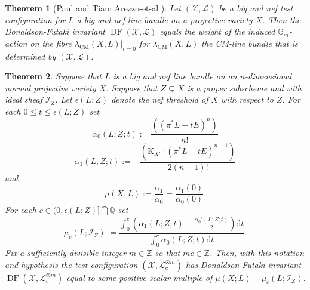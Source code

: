 \documentclass[10pt,a4paper]{amsart}
\newtheorem{theorem}{Theorem}
\newcommand{\Ish}{\mathcal{I}}
\newcommand{\K}{\mathrm{K}}
\newcommand{\QQ}{\mathbb{Q}} %
\newcommand{\ZZ}{\mathbb{Z}} %
\renewcommand{\leq}{\leqslant}
\begin{document}
\begin{theorem}[Paul and Tian; Arezzo-et-al {\cite[Proposition 3.3]{Arezzo:DellaVedova:LaNave}}]\label{Paul:Tian:DF:Thm}
Let $(\mathcal{X},\mathcal{L})$ be a big and nef test configuration for $L$ a big and nef line bundle on a projective variety $X$.  Then the Donaldson-Futaki invariant $\operatorname{DF}(\mathcal{X},\mathcal{L})$ equals the weight of the induced $\mathbb{G}_m$-action on the fibre $\lambda_{\mathrm{CM}}(X,L)|_{t = 0}$ for $\lambda_{\mathrm{CM}}(X,L)$ the CM-line bundle that is determined by $(\mathcal{X},\mathcal{L})$.
\end{theorem}

\begin{theorem}\label{Ross:Thomas:Slope:Stab:DF}
Suppose that $L$ is a big and nef line bundle on an $n$-dimensional normal projective variety $X$.  Suppose that $Z \subsetneq X$ is a proper subscheme and with ideal sheaf $\Ish_Z$.  Let $\epsilon(L;Z)$ denote the nef threshold of $X$ with respect to $Z$.  For each $0 \leq t \leq \epsilon(L;Z)$ set
\begin{equation}\label{alpha0}
\alpha_0(L;Z; t) := \frac{((\pi^*L - t E)^n )}{n!}
\end{equation}
\begin{equation}\label{alpha1}
\alpha_1(L;Z; t) := - \frac{(\K_{X'} \cdot(\pi^*L - t E)^{n-1})}{2(n-1)!}
\end{equation}
and
\begin{equation}\label{slope}
\mu(X;L) := \frac{\alpha_1}{\alpha_0} = \frac{\alpha_1(0)}{\alpha_0(0)} \text{.}
\end{equation}
For each 
$c \in (0, \epsilon(L;Z)] \bigcap \QQ$
set
$$
\mu_c(L;\Ish_Z) := \frac{ \int_0^c \left( \alpha_1(L;Z;t) + \frac{\alpha_0'(L;Z;t)}{2} \right) \mathrm{d}t }{ \int_0^c \alpha_0(L;Z;t) \mathrm{d}t } \text{.}
$$
Fix a sufficiently divisible integer $m \in \ZZ$ so that $mc \in \ZZ$.  Then, with this notation and hypothesis the test configuration $(\mathcal{X}, \mathcal{L}_c^{\otimes m})$ has Donaldson-Futaki invariant $\operatorname{DF}(\mathcal{X},\mathcal{L}_c^{\otimes m})$ equal to some positive scalar multiple of $\mu(X;L) - \mu_c(L;\Ish_Z)$.
\end{theorem}
\end{document}
